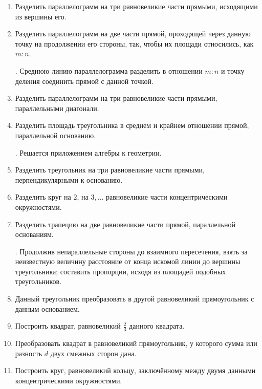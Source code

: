 \begin{enumerate}[resume]
\item
Разделить параллелограмм на три равновеликие части прямыми, исходящими из вершины его.

\item
Разделить параллелограмм на две части прямой, проходящей через данную точку на продолжении его стороны, так, чтобы их площади относились, как $m:n$. %

\smallskip
{}.
Среднюю линию параллелограмма разделить в отношении $m:n$ и точку деления соединить прямой с данной точкой.  

\item
Разделить параллелограмм на три равновеликие части прямыми, параллельными диагонали.

\item
Разделить площадь треугольника в среднем и крайнем отношении прямой, параллельной основанию.

\smallskip
{}.
Решается приложением алгебры к геометрии.

\item
Разделить треугольник на три равновеликие части прямыми, перпендикулярными к основанию.

\item
Разделить круг на $2$, на $3,\dots$ равновеликие части концентрическими окружностями.

\item
Разделить трапецию на две равновеликие части прямой, параллельной основаниям.

\smallskip
{}.
Продолжив непараллельные стороны до взаимного пересечения, взять за неизвестную величину расстояние от конца искомой линии до вершины треугольника;
составить пропорции, исходя из площадей подобных треугольников.

\item
Данный треугольник преобразовать в другой равновеликий прямоугольник с данным основанием.

\item
Построить квадрат, равновеликий $\tfrac23$ данного квадрата.

\item
Преобразовать квадрат в равновеликий прямоугольник, у которого сумма или разность $d$ двух смежных сторон дана.

\item
Построить круг, равновеликий кольцу, заключённому между двумя данными концентрическими окружностями.


\end{enumerate}
